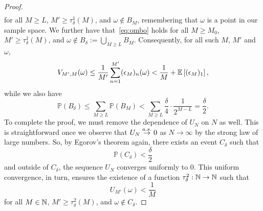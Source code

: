 \begin{proof}
\begin{align}
        \end{align}
        for all $M \geq L$, $M' \geq \tau^1_\delta(M)$, and $\omega \not\in B_M$, remembering that $\omega$ is
        a point in our sample space.  We further have that~\eqref{eq:ombo} holds for all 
        $M \geq M_0$, $M' \geq \tau^1_\delta(M)$, and $\omega \not\in B_\delta := \bigcup_{M \geq L} B_M$.
        Consequently, for all such $M$, $M'$ and $\omega$,
        \begin{equation} 
                \label{eqn:almostsure:1}
                V_{M',M}(\omega)
                \leq
                \frac{1}{M'} \sum_{n=1}^{M'} (\epsilon_M)_n(\omega) 
                < 
                \frac{1}{M} + \mathbb{E}\left[(\epsilon_M)_1\right],
        \end{equation}
        while we also have
        \begin{equation} 
                \label{eqn:almostsure:2}
                \mathbb{P}(B_\delta) 
                \leq 
                \sum_{M \geq L} \mathbb{P}\left(B_M\right)
                < \sum_{M \geq L} \frac{\delta}{4} \cdot \frac{1}{2^{M-L}}
                = \frac{\delta}{2}.
        \end{equation}
      To complete the proof, we must remove the dependence of $U_N$ on $N$ as well. This is
	straightforward once we observe that $U_N \overset{a.s.}{\to} 0$ as $N \to \infty$ by the strong law of 
        large numbers. So, by Egorov's theorem again, there exists an event $C_\delta$ such that
        \begin{equation} 
                \label{eqn:almostsure:3}
                \mathbb{P}(C_\delta) < \frac{\delta}{2}
        \end{equation}
        and outside of $C_\delta$, the sequence $U_N$ converges uniformly to $0$. This uniform convergence,
        in turn, ensures the existence of a function $\tau^2_\delta : \mathbb{N} \to \mathbb{N}$ such that
        \begin{equation} 
                \label{eqn:almostsure:4}
                U_{M'}(\omega) < \frac{1}{M} 
        \end{equation}
        for all $M \in \mathbb{N}$, $M' \geq \tau^2_\delta(M)$, and $\omega \not\in C_\delta$.
	

\end{proof}
